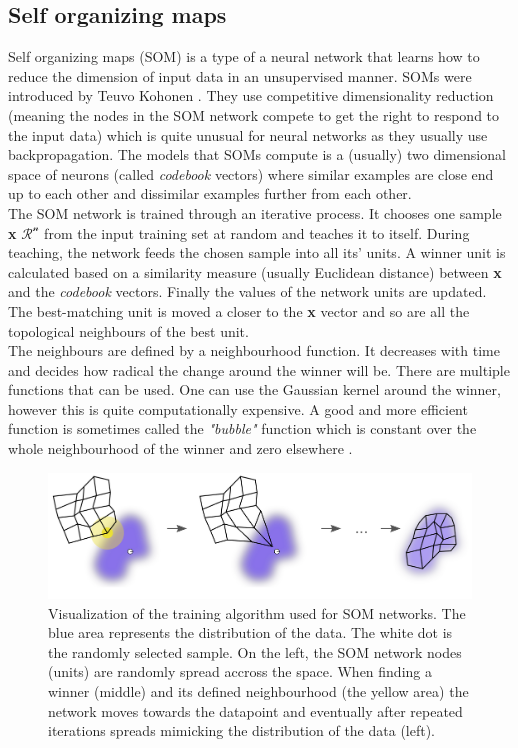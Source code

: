 \subsection{Self organizing maps}
Self organizing maps (SOM) is a type of a neural network that learns how to reduce the dimension of input data in an unsupervised manner. SOMs were introduced by Teuvo Kohonen \cite{Kohonen1982}. They use competitive dimensionality reduction (meaning the nodes in the SOM network compete to get the right to respond to the input data) which is quite unusual for neural networks as they usually use backpropagation. The models that SOMs compute is a (usually) two dimensional space of neurons (called \textit{codebook} vectors) where similar examples are close end up to each other and dissimilar examples further from each other.\\
The SOM network is trained through an iterative process. It chooses one sample \textbf{x} \in  $ \mathcal{R^n} $ from the input training set at random and teaches it to itself. During teaching, the network feeds the chosen sample into all its' units. A winner unit is calculated based on a similarity measure (usually Euclidean distance) between \textbf{x} and the \textit{codebook} vectors. Finally the values of the network units are updated. The best-matching unit is moved a closer to the \textbf{x} vector and so are all the topological neighbours of the best unit.\\
The neighbours are defined by a neighbourhood function. It decreases with time and decides how radical the change around the winner will be. There are multiple functions that can be used. One can use the Gaussian kernel around the winner, however this is quite computationally expensive. A good and more efficient function is sometimes called the \textit{"bubble"} function which is constant over the whole neighbourhood of the winner and zero elsewhere \cite{SOM_training}.
\begin{figure}[h]
    \centering
	\includegraphics[width=140mm]{./img/Somtraining.png}
	\caption{Visualization of the training algorithm used for SOM networks. The blue area represents the distribution of the data. The white dot is the randomly selected sample. On the left, the SOM network nodes (units) are randomly spread accross the space. When finding a winner (middle) and its defined neighbourhood (the yellow area) the network moves towards the datapoint and eventually after repeated iterations spreads mimicking the distribution of the data (left).}
	\label{fig:som_training}
\end{figure}

